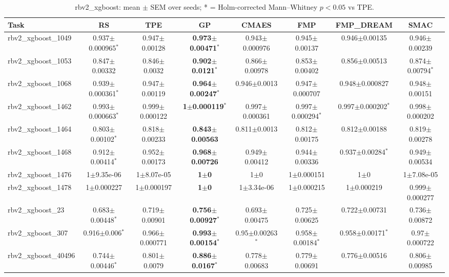 \begin{table}[t]
\caption{ rbv2_xgboost: mean $\pm$ SEM over seeds; * = Holm-corrected Mann--Whitney $p<0.05$ vs TPE.}
\label{tab:_rbv2_xgboost}
\begin{center}\small
\begin{tabular}{lccccccc}
\hline
Task & RS & TPE & GP & CMAES & FMP & FMP\_DREAM & SMAC \\
\hline
rbv2\_xgboost\_1049 & 0.937$\pm$0.000965$^{*}$ & 0.947$\pm$0.00128 & \textbf{0.973$\pm$0.00471}$^{*}$ & 0.943$\pm$0.000976 & 0.945$\pm$0.00137 & 0.946$\pm$0.00135 & 0.946$\pm$0.00239 \\
rbv2\_xgboost\_1053 & 0.847$\pm$0.00332 & 0.846$\pm$0.0032 & \textbf{0.902$\pm$0.0121}$^{*}$ & 0.866$\pm$0.00978 & 0.853$\pm$0.00402 & 0.856$\pm$0.00513 & 0.874$\pm$0.00794$^{*}$ \\
rbv2\_xgboost\_1068 & 0.939$\pm$0.000361$^{*}$ & 0.947$\pm$0.00119 & \textbf{0.964$\pm$0.00247}$^{*}$ & 0.946$\pm$0.0013 & 0.947$\pm$0.000707 & 0.948$\pm$0.000827 & 0.948$\pm$0.00151 \\
rbv2\_xgboost\_1462 & 0.993$\pm$0.000663$^{*}$ & 0.999$\pm$0.000122 & \textbf{1$\pm$0.000119}$^{*}$ & 0.997$\pm$0.000361 & 0.997$\pm$0.000294$^{*}$ & 0.997$\pm$0.000202$^{*}$ & 0.998$\pm$0.000202 \\
rbv2\_xgboost\_1464 & 0.803$\pm$0.00102$^{*}$ & 0.818$\pm$0.00233 & \textbf{0.843$\pm$0.00563} & 0.811$\pm$0.0013 & 0.812$\pm$0.00175 & 0.812$\pm$0.00188 & 0.819$\pm$0.00278 \\
rbv2\_xgboost\_1468 & 0.912$\pm$0.00414$^{*}$ & 0.952$\pm$0.00173 & \textbf{0.968$\pm$0.00726} & 0.949$\pm$0.00412 & 0.944$\pm$0.00336 & 0.937$\pm$0.00284$^{*}$ & 0.949$\pm$0.00534 \\
rbv2\_xgboost\_1476 & 1$\pm$9.35e-06 & 1$\pm$8.07e-05 & \textbf{1$\pm$0} & 1$\pm$0 & 1$\pm$0.000151 & 1$\pm$0 & 1$\pm$7.08e-05 \\
rbv2\_xgboost\_1478 & 1$\pm$0.000227 & 1$\pm$0.000197 & \textbf{1$\pm$0} & 1$\pm$3.34e-06 & 1$\pm$0.000215 & 1$\pm$0.000219 & 0.999$\pm$0.000277 \\
rbv2\_xgboost\_23 & 0.683$\pm$0.00448$^{*}$ & 0.719$\pm$0.00901 & \textbf{0.756$\pm$0.00927}$^{*}$ & 0.693$\pm$0.00475 & 0.725$\pm$0.00625 & 0.722$\pm$0.00731 & 0.736$\pm$0.00872 \\
rbv2\_xgboost\_307 & 0.916$\pm$0.006$^{*}$ & 0.966$\pm$0.000771 & \textbf{0.993$\pm$0.00154}$^{*}$ & 0.95$\pm$0.00263$^{*}$ & 0.958$\pm$0.00184$^{*}$ & 0.958$\pm$0.00171$^{*}$ & 0.97$\pm$0.000722 \\
rbv2\_xgboost\_40496 & 0.744$\pm$0.00446$^{*}$ & 0.801$\pm$0.0079 & \textbf{0.886$\pm$0.0167}$^{*}$ & 0.778$\pm$0.00683 & 0.779$\pm$0.00691 & 0.776$\pm$0.00516 & 0.806$\pm$0.00985 \\

\end{tabular}
\end{center}
\end{table}
